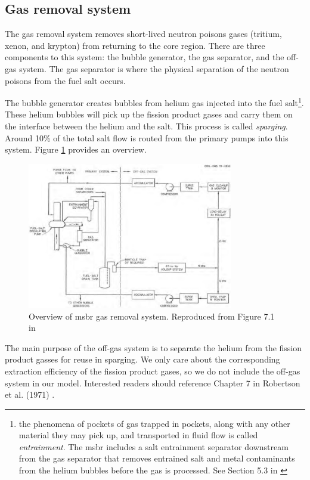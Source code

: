 \subsection{Gas removal system}
The gas removal system removes short-lived neutron poisons gases (tritium,
xenon, and krypton) from returning to the core region. There are three
components to this system: the bubble generator, the gas separator, and the
off-gas system. The gas separator is where the physical separation of the
neutron poisons from the fuel salt occurs.

The bubble generator creates bubbles from helium gas injected into the fuel
salt\footnote{the phenomena of pockets of gas trapped in pockets, along with any
other material they may pick up, and transported in fluid flow is called {\it
entrainment}. The \Gls{msbr} includes a salt entrainment separator downstream
from the gas separator that removes entrained salt and metal contaminants from
the helium bubbles before the gas is processed. See Section 5.3 in
\cite{rosenthal_molten-salt_1968}}. These helium bubbles will pick up the
fission product gases and carry them on the interface between the helium and the
salt. This process is called {\it sparging}. Around 10\% of the total salt flow
is routed from the primary pumps into this system. Figure
\ref{fig:gas_removal_system} provides an overview.

\begin{figure}[htpb]
    \centering
    \includegraphics[width=0.8\textwidth]{figs/ch4/gas_removal_system.png}
    \caption{Overview of \Gls{msbr} gas removal system. Reproduced from Figure 7.1 in \cite{robertson_conceptual_1971}}
    \label{fig:gas_removal_system}
\end{figure}

The main purpose of the off-gas system is to separate the helium from the
fission product gasses for reuse in sparging. We only care about the
corresponding extraction efficiency of the fission product gases, so we do
not include the off-gas system in our model. Interested readers should reference
Chapter 7 in Robertson et al. (1971) \cite{robertson_conceptual_1971}.

